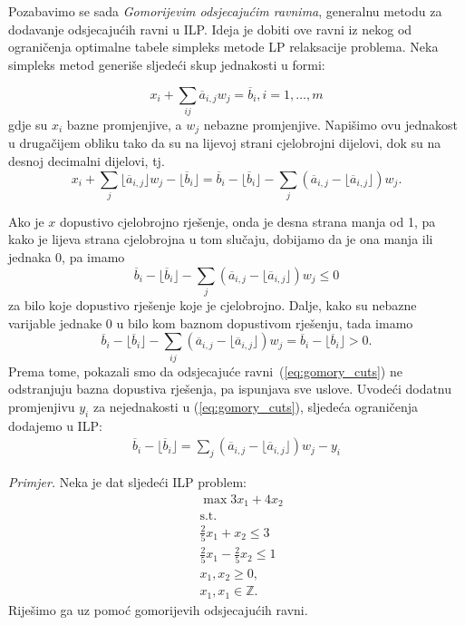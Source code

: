 \documentclass[a4paper, utf8, 11pt, colorlinks]{article}
\begin{document}
Pozabavimo se sada \emph{Gomorijevim odsjecajućim ravnima}, generalnu metodu za dodavanje odsjecajućih ravni u ILP.  Ideja je dobiti ove ravni iz nekog od ograničenja optimalne tabele simpleks metode LP relaksacije problema. Neka simpleks metod generiše sljedeći skup jednakosti u formi:

$$x_i + \sum_{ij} \overline{a}_{i,j} w_j= \overline{b}_i, i=1, \ldots,m$$
gdje su $x_i$ bazne promjenjive, a $w_j$ nebazne promjenjive. Napišimo ovu jednakost u drugačijem obliku tako da su na lijevoj strani cjelobrojni dijelovi, dok su na desnoj decimalni dijelovi, tj.
$$x_i + \sum_{j} \lfloor \overline{a}_{i,j} \rfloor w_j - \lfloor \overline{b}_i \rfloor = \overline{b}_i - \lfloor \overline{b}_i  \rfloor    - \sum_{j} (\overline{a}_{i,j} - \lfloor \overline{a}_{i,j} \rfloor) w_j.$$

Ako je $x$ dopustivo cjelobrojno rješenje, onda je desna strana manja od 1, pa kako je lijeva strana cjelobrojna u tom slučaju, dobijamo da je ona manja ili jednaka 0, pa imamo
\begin{equation}\label{eq:gomory_cuts}
    \overline{b}_i - \lfloor \overline{b}_i  \rfloor    - \sum_{j} (\overline{a}_{i,j} - \lfloor \overline{a}_{i,j} \rfloor) w_j \leq 0
\end{equation}
za bilo koje dopustivo rješenje koje je cjelobrojno. Dalje, kako su nebazne varijable jednake 0 u bilo kom baznom dopustivom rješenju, tada imamo 
$$ \overline{b}_i - \lfloor \overline{b}_i  \rfloor    - \sum_{ij} (\overline{a}_{i,j} - \lfloor \overline{a}_{i,j} \rfloor) w_j = \overline{b}_i - \lfloor \overline{b}_i \rfloor  > 0.$$
Prema tome, pokazali smo da odsjecajuće ravni~(\ref{eq:gomory_cuts}) ne odstranjuju bazna dopustiva rješenja, pa ispunjava sve uslove. Uvodeći dodatnu promjenjivu $y_i$ za nejednakosti u (\ref{eq:gomory_cuts}), sljedeća ograničenja dodajemo u ILP:
\begin{align}\label{gomory_cplex}
       \overline{b}_i - \lfloor \overline{b}_i \rfloor=   \sum_{j} (\overline{a}_{i,j} - \lfloor \overline{a}_{i,j} \rfloor) w_j - y_i 
\end{align}

\emph{Primjer.} Neka je dat sljedeći ILP problem:\\
$$\begin{array}{ll}
    &\max 3 x_1 + 4 x_2 \\
    &\mbox{s.t. }  \\
    & \frac{2}{5}x_1 + x_2 \leq 3 \\
    &\frac{2}{5}x_1 - \frac{2}{5}x_2 \leq 1 \\
    &x_1, x_2 \geq 0, \\
    &  x_1, x_1 \in \mathbb{Z}.
\end{array}$$
Riješimo ga uz pomoć gomorijevih odsjecajućih ravni. 
\end{document}
